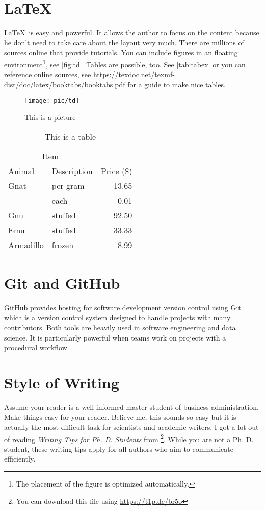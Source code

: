 \documentclass[12pt,final,a4paper,oneside]{book}
\begin{document}
	\section{\LaTeX}
	
	\LaTeX\ is easy and powerful. It allows the author to focus on the content because he don't need to take care about the layout very much. There are millions of sources online that provide tutorials. You can include figures in an floating environment\footnote{The placement of the figure is optimized automatically.}, see \autoref{fig:td}. Tables are possible, too. See \autoref{tab:tabex} or you can reference online sources, see \url{https://texdoc.net/texmf-dist/doc/latex/booktabs/booktabs.pdf} for a guide to make nice tables.
	
	\begin{figure}\centering
		\texttt{[image: pic/td]}\caption{This is a picture}\label{fig:td}
	\end{figure}
	
	\begin{table}\centering
		\caption{This is a table}\label{tab:tabex}
		\begin{tabular}{@{}llr@{}} \toprule\multicolumn{2}{c}{Item} \\ \cmidrule(r){1-2}Animal & Description & Price (\$)\\ \midrule Gnat  & per gram  & 13.65 \\& each      & 0.01 \\Gnu   & stuffed   & 92.50 \\Emu   & stuffed   & 33.33 \\Armadillo & frozen & 8.99 \\ \bottomrule
		\end{tabular}
	\end{table}
	
	\section{Git and GitHub}
	GitHub  provides hosting for software development version control using Git which is a version control system designed to handle projects with many contributors. Both tools are heavily used in software engineering and data science. It is particularly powerful when teams work on projects with a procedural workflow.
	
	\section{Style of Writing}
	Assume your reader is a well informed master student of business administration. Make things easy for your reader. Believe me, this sounds so easy but it is actually the most difficult task for scientists and academic writers. I got a lot out of reading  \textit{Writing Tips for Ph.  D. Students} from \cite{Cochrane2005Writing}\footnote{You can download this file using \url{https://t1p.de/br5o}}. While you are not a Ph. D. student, these writing tips apply for all authors who aim to communicate efficiently. 
	
\end{document}
